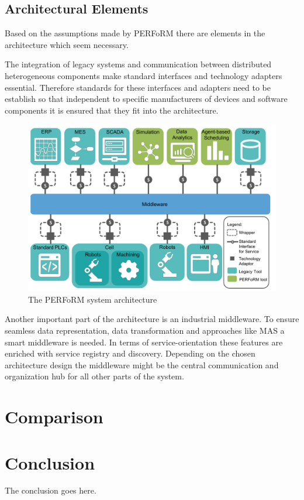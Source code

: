 \documentclass[conference,compsoc]{IEEEtran}
\begin{document}
\subsection{Architectural Elements}
Based on the assumptions made by PERFoRM there are elements in the architecture which seem necessary.

The integration of legacy systems and communication between distributed heterogeneous components make standard interfaces and technology adapters essential.
Therefore standards for these interfaces and adapters need to be establish so that independent to specific manufacturers of devices and software components it is ensured that they fit into the architecture.

\begin{figure}[ht]
	\includegraphics[width=\columnwidth]{img/PERFoRM-Architecture.png}
	\caption{The PERFoRM system architecture\cite{SpecPERFoRM}}
\end{figure}

Another important part of the architecture is an industrial middleware. To ensure seamless data representation, data transformation and approaches like MAS a smart middleware is needed. In terms of service-orientation these features are enriched with service registry and discovery. Depending on the chosen architecture design the middleware might be the central communication and organization hub for all other parts of the system.


\section{Comparison} %
\section{Conclusion} %
The conclusion goes here.
\end{document}
